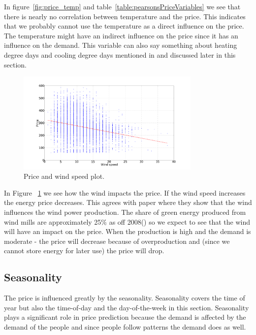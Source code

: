 In figure~\ref{fig:price_temp} and table~\ref{table:pearsonsPriceVariables} we see that there is nearly no correlation between temperature and the price. This indicates that we probably cannot use the temperature as a direct influence on the price. The temperature might have an indirect influence on the price since it has an influence on the demand. This variable can also say something about heating degree days and cooling degree days mentioned in \cite{19} and discussed later in this section.

\begin{figure}[H]
\centering
\includegraphics[width=0.8\textwidth]{billeder/energy_price_plots/price_wind.png}
\caption{Price and wind speed plot.}
\label{fig:price_wind}
\end{figure}

In Figure ~\ref{fig:price_wind} we see how the wind impacts the price. If the wind speed increases the energy price decreases. This agrees with paper \cite{dayAheadImpactOfWindPowerForecasts} where they show that the wind influences the wind power production. The share of green energy produced from wind mills are approximately 25\% as off 2008(\cite{windPowerDanishLiberalized}) so we expect to see that the wind will have an impact on the price. When the production is high and the demand is moderate - the price will decrease because of overproduction and (since we cannot store energy for later use) the price will drop.

\subsection{Seasonality}\label{sec:seasonality}
The price is influenced greatly by the seasonality. Seasonality covers the time of year but also the time-of-day and the day-of-the-week in this section. Seasonality plays a significant role in price prediction because the demand is affected by the demand of the people and since people follow patterns the demand does as well.

